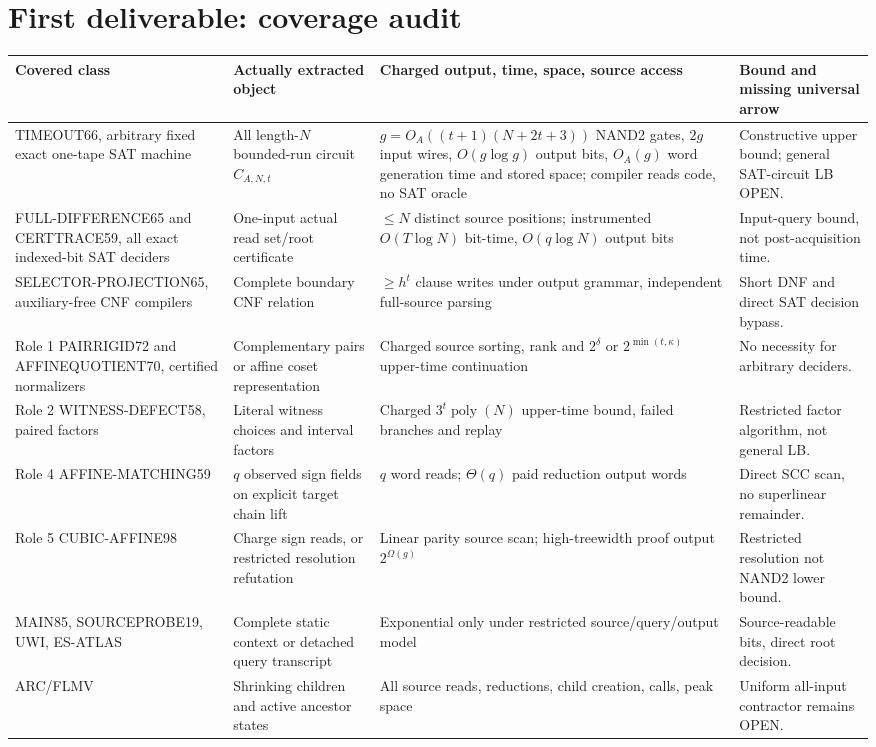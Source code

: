 \documentclass[10pt]{article}
\begin{document}
\section{First deliverable: coverage audit}
{\scriptsize\begin{longtable}{p{.20\linewidth}p{.22\linewidth}p{.30\linewidth}p{.20\linewidth}}
\toprule
Covered class & Actually extracted object & Charged output, time, space, source access & Bound and missing universal arrow\\\midrule\endhead
TIMEOUT66, arbitrary fixed exact one-tape SAT machine & All length-$N$ bounded-run circuit $C_{A,N,t}$ & $g=O_A((t+1)(N+2t+3))$ NAND2 gates, $2g$ input wires, $O(g\log g)$ output bits, $O_A(g)$ word generation time and stored space; compiler reads code, no SAT oracle & Constructive upper bound; general SAT-circuit LB OPEN.\\
FULL-DIFFERENCE65 and CERTTRACE59, all exact indexed-bit SAT deciders & One-input actual read set/root certificate & $\le N$ distinct source positions; instrumented $O(T\log N)$ bit-time, $O(q\log N)$ output bits & Input-query bound, not post-acquisition time.\\
SELECTOR-PROJECTION65, auxiliary-free CNF compilers & Complete boundary CNF relation & $\ge h^t$ clause writes under output grammar, independent full-source parsing & Short DNF and direct SAT decision bypass.\\
Role 1 PAIRRIGID72 and AFFINEQUOTIENT70, certified normalizers & Complementary pairs or affine coset representation & Charged source sorting, rank and $2^\delta$ or $2^{\min(t,\kappa)}$ upper-time continuation & No necessity for arbitrary deciders.\\
Role 2 WITNESS-DEFECT58, paired factors & Literal witness choices and interval factors & Charged $3^t\operatorname{poly}(N)$ upper-time bound, failed branches and replay & Restricted factor algorithm, not general LB.\\
Role 4 AFFINE-MATCHING59 & $q$ observed sign fields on explicit target chain lift & $q$ word reads; $\Theta(q)$ paid reduction output words & Direct SCC scan, no superlinear remainder.\\
Role 5 CUBIC-AFFINE98 & Charge sign reads, or restricted resolution refutation & Linear parity source scan; high-treewidth proof output $2^{\Omega(g)}$ & Restricted resolution not NAND2 lower bound.\\
MAIN85, SOURCEPROBE19, UWI, ES-ATLAS & Complete static context or detached query transcript & Exponential only under restricted source/query/output model & Source-readable bits, direct root decision.\\
ARC/FLMV & Shrinking children and active ancestor states & All source reads, reductions, child creation, calls, peak space & Uniform all-input contractor remains OPEN.\\
\bottomrule\end{longtable}}
\end{document}
